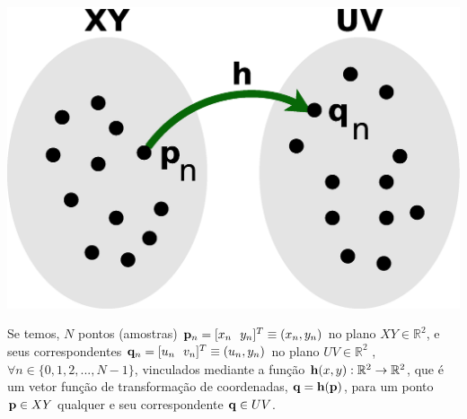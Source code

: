 \begin{theorem}
\label{theo:mapeamento}

~\\
\begin{minipage}{0.4\textwidth}
\centering
\includegraphics[width=0.8\linewidth]{chapters/inverso-mapeamento/mapeamento.eps} 
\end{minipage}
\begin{minipage}{0.6\textwidth}
\quad Se temos, $N$ pontos (amostras) $\VECTOR{p}_n=[x_n~~y_n]^T\equiv (x_n,y_n)$ no plano $XY \in \mathbb{R}^2$, e
seus correspondentes $\VECTOR{q}_n=[u_n~~v_n]^T\equiv (u_n,y_n)$
no plano $UV \in \mathbb{R}^2$ ,
$\forall n\in \{0, 1, 2, ..., N-1\}$, 
vinculados mediante a função $\VECTOR{h}(x,y): \mathbb{R}^2 \rightarrow \mathbb{R}^2$, 
que é um vetor função de transformação de coordenadas,
$\VECTOR{q}=\VECTOR{h}(\VECTOR{p})$, 
para um ponto $\VECTOR{p} \in XY$ qualquer e seu correspondente $\VECTOR{q} \in UV$.\\
\end{minipage}


\end{theorem}
